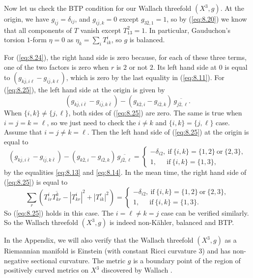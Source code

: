 \documentclass{amsart}
\numberwithin{equation}{section}
\theoremstyle{definition}
\renewcommand{\1}{\mathds{1}}
\renewcommand{\>}{\rightarrow}
\begin{document}
Now let us check the BTP condition for our Wallach threefold $(X^3,g)$. At the origin, we have $g_{i\overline{j}}=\delta_{ij}$, and $g_{i\overline{j},k} =0$ except $g_{3\overline{2},1} =1$, so by (\ref{eq:8.20}) we know that all components of $T$ vanish except $T^2_{13}=1$. In particular, Gauduchon's torsion $1$-form $\eta=0$ as $\eta_k = \sum_i T^i_{ik}$, so $g$ is balanced.

For (\ref{eq:8.24}), the right hand side is zero because, for each of these three terms, one of the two factors is zero when $r$ is $2$ or not $2$. Its left hand side at $0$ is equal to $(g_{k\overline{j},i\ell} - g_{i\overline{j},k\ell})$, which is zero by the last equality in (\ref{eq:8.11}). For (\ref{eq:8.25}), the left hand side  at the origin is given by
$$  (g_{k\overline{j},i\overline{\ell}} - g_{i\overline{j},k\overline{\ell}}) - (g_{k\overline{2},i} - g_{i\overline{2},k} ) \, \overline{g_{j\overline{2},\ell} } .$$
When $\{i,k\}\neq \{j,\ell\}$, both sides of (\ref{eq:8.25}) are zero. The same is true when $i=j=k=\ell$, so we just need to check the $i\neq k$ and $\{ i,k\} =\{ j,\ell\}$ case. Assume that $i=j\neq k=\ell$. Then the left hand side of (\ref{eq:8.25}) at the origin is equal to
\[(g_{k\overline{j},i\overline{\ell}} - g_{i\overline{j},k\overline{\ell}}) - (g_{k\overline{2},i} - g_{i\overline{2},k} ) \, \overline{g_{j\overline{2},\ell} } =
\begin{cases}
-\delta_{i2},\ \text{if}\ \{i,k\}=\{1,2\}\ \text{or}\ \{2,3\},\\
1,\quad \ \ \text{if}\ \{i,k\}=\{1,3\},
\end{cases}\]
by the equalities \eqref{eq:8.13} and \eqref{eq:8.14}. In the mean time, the right hand side of (\ref{eq:8.25}) is equal to
$$  \sum_r ( T^i_{ir} \overline{T^k_{kr}} - |T^i_{kr}|^2 + |T^r_{ik}|^2) =
\begin{cases} -\delta_{i2},\ \text{if}\ \{i,k\}=\{1,2\}\ \text{or}\ \{2,3\},\\
1,\quad \ \ \text{if}\ \{i,k\}=\{1,3\}.\end{cases}$$
So (\ref{eq:8.25}) holds in this case. The $i=\ell \neq k=j$ case can be verified similarly. So the Wallach threefold $(X^3,g)$ is indeed non-K\"ahler, balanced and BTP.

In the Appendix, we will also verify that the Wallach threefold $(X^3,g)$ as a Riemannian manifold is Einstein (with constant Ricci curvature $3$) and has non-negative sectional curvature. The metric $g$ is a boundary point of the region of positively curved metrics on $X^3$ discovered by Wallach \cite{Wallach}.
\end{document}
